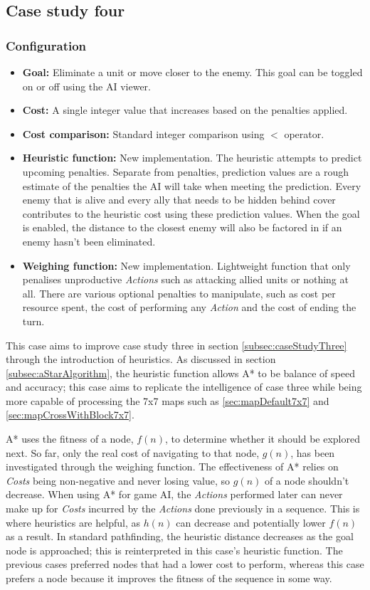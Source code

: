 \documentclass[11pt, a4paper]{report}
\begin{document}
\subsection{Case study four}
\label{subsec:caseStudyFour}

\subsubsection{Configuration}

\begin{itemize}
  \item \textbf{Goal:} Eliminate a unit or move closer to the enemy. This goal can be toggled on or off using the AI viewer.
  \item \textbf{Cost:} A single integer value that increases based on the penalties applied.
  \item \textbf{Cost comparison:} Standard integer comparison using $<$ operator.
  \item \textbf{Heuristic function:} New implementation. The heuristic attempts to predict upcoming penalties. Separate from penalties, prediction values are a rough estimate of the penalties the AI will take when meeting the prediction. Every enemy that is alive and every ally that needs to be hidden behind cover contributes to the heuristic cost using these prediction values. When the goal is enabled, the distance to the closest enemy will also be factored in if an enemy hasn't been eliminated.
  \item \textbf{Weighing function:} New implementation. Lightweight function that only penalises unproductive \emph{Actions} such as attacking allied units or nothing at all. There are various optional penalties to manipulate, such as cost per resource spent, the cost of performing any \emph{Action} and the cost of ending the turn.
\end{itemize}

This case aims to improve case study three in section \ref{subsec:caseStudyThree} through the introduction of heuristics. As discussed in section \ref{subsec:aStarAlgorithm}, the heuristic function allows A* to be balance of speed and accuracy; this case aims to replicate the intelligence of case three while being more capable of processing the 7x7 maps such as \ref{sec:mapDefault7x7} and \ref{sec:mapCrossWithBlock7x7}. 

A* uses the fitness of a node, $f(n)$, to determine whether it should be explored next. So far, only the real cost of navigating to that node, $g(n)$, has been investigated through the weighing function. The effectiveness of A* relies on \emph{Costs} being non-negative and never losing value, so $g(n)$ of a node shouldn't decrease. When using A* for game AI, the \emph{Actions} performed later can never make up for \emph{Costs} incurred by the \emph{Actions} done previously in a sequence. This is where heuristics are helpful, as $h(n)$ can decrease and potentially lower $f(n)$ as a result. In standard pathfinding, the heuristic distance decreases as the goal node is approached; this is reinterpreted in this case's heuristic function. The previous cases preferred nodes that had a lower cost to perform, whereas this case prefers a node because it improves the fitness of the sequence in some way. 
\end{document}

